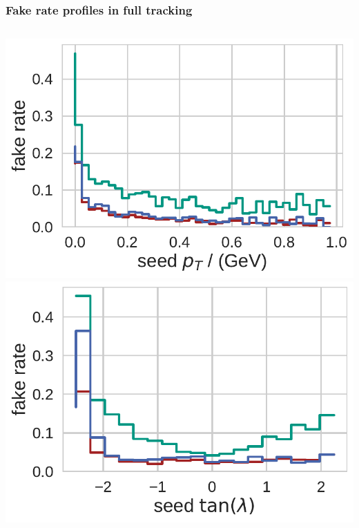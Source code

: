 \documentclass[18pt, aspectratio=169]{beamer}
\begin{document}
\begin{frame}
  \frametitle{Fake rate profiles in full tracking}
  \begin{columns}
    \begin{column}{.5\textwidth}
      \centering
      \includegraphics[width=.55\textwidth]{figures/fake_rate_by_pt_truth_fullreco_trainedWithFakes.pdf}\\
      \includegraphics[width=.55\textwidth]{figures/fake_rate_by_tan_lambda_truth_fullreco_trainedWithFakes.pdf}
    \end{column}


\end{columns}
\end{frame}
\end{document}
